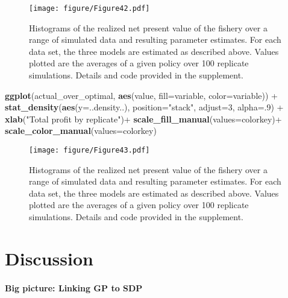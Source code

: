 \documentclass[author-year, review]{elsarticle} %
\makeatletter
\newenvironment{Shaded}{}{}
\newcommand{\KeywordTok}[1]{\textcolor[rgb]{0.00,0.44,0.13}{\textbf{{#1}}}}
\newcommand{\DataTypeTok}[1]{\textcolor[rgb]{0.56,0.13,0.00}{{#1}}}
\newcommand{\DecValTok}[1]{\textcolor[rgb]{0.25,0.63,0.44}{{#1}}}
\newcommand{\StringTok}[1]{\textcolor[rgb]{0.25,0.44,0.63}{{#1}}}
\newcommand{\NormalTok}[1]{{#1}}
\def\maxwidth{\ifdim\Gin@nat@width>\linewidth\linewidth
\else\Gin@nat@width\fi}
\let\Oldincludegraphics\includegraphics
\renewcommand{\includegraphics}[1]{\Oldincludegraphics[width=\maxwidth]{#1}}
\makeatother
\begin{document}
\begin{figure}[htbp]
\centering
\texttt{[image: figure/Figure42.pdf]}
\caption{Histograms of the realized net present value of the fishery
over a range of simulated data and resulting parameter estimates. For
each data set, the three models are estimated as described above. Values
plotted are the averages of a given policy over 100 replicate
simulations. Details and code provided in the supplement.}
\end{figure}

\begin{Shaded}
\begin{Highlighting}[]

\KeywordTok{ggplot}\NormalTok{(actual_over_optimal, }\KeywordTok{aes}\NormalTok{(value, }\DataTypeTok{fill=}\NormalTok{variable, }\DataTypeTok{color=}\NormalTok{variable)) + }
  \KeywordTok{stat_density}\NormalTok{(}\KeywordTok{aes}\NormalTok{(}\DataTypeTok{y=}\NormalTok{..density..), }\DataTypeTok{position=}\StringTok{"stack"}\NormalTok{, }\DataTypeTok{adjust=}\DecValTok{3}\NormalTok{, }\DataTypeTok{alpha=}\NormalTok{.}\DecValTok{9}\NormalTok{) + }
  \KeywordTok{xlab}\NormalTok{(}\StringTok{"Total profit by replicate"}\NormalTok{)+ }\KeywordTok{scale_fill_manual}\NormalTok{(}\DataTypeTok{values=}\NormalTok{colorkey)+ }\KeywordTok{scale_color_manual}\NormalTok{(}\DataTypeTok{values=}\NormalTok{colorkey)}
\end{Highlighting}
\end{Shaded}

\begin{figure}[htbp]
\centering
\texttt{[image: figure/Figure43.pdf]}
\caption{Histograms of the realized net present value of the fishery
over a range of simulated data and resulting parameter estimates. For
each data set, the three models are estimated as described above. Values
plotted are the averages of a given policy over 100 replicate
simulations. Details and code provided in the supplement.}
\end{figure}

\section{Discussion}

\paragraph{Big picture: Linking GP to SDP}
\end{document}
